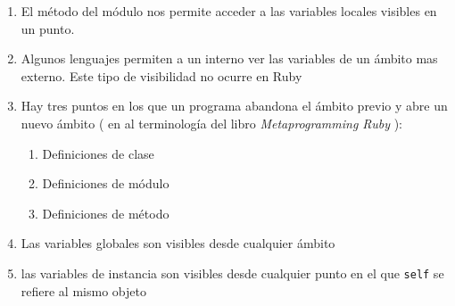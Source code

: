 \begin{enumerate}
\item 
El método  del módulo \Kernel{} nos permite acceder
a las variables locales visibles en un punto.
\item 
Algunos lenguajes permiten a un  interno ver las variables
de un ámbito mas externo. Este tipo de visibilidad no ocurre en Ruby
\item 
Hay tres puntos en los que un programa abandona el ámbito previo y
abre un nuevo ámbito ( en al terminología del libro \emph{Metaprogramming Ruby}
\cite{metaprogramming}):
\begin{enumerate}
\item 
Definiciones de clase
\item 
Definiciones de módulo
\item 
Definiciones de método
\end{enumerate}
\item 
Las variables globales son visibles desde cualquier ámbito
\item 
las variables de instancia son visibles desde cualquier punto en el que 
\verb|self| se refiere al mismo objeto
\end{enumerate}


